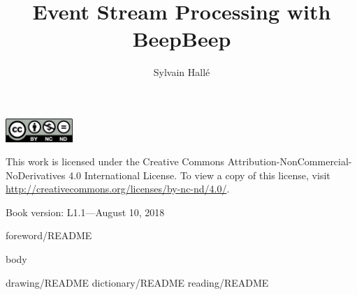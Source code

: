 \documentclass{lifmanual}
\title{Event Stream Processing with BeepBeep}
\author{Sylvain Hallé}
\begin{document}
\frontmatter

\newpage

\cleardoublepage

\newpage

\thispagestyle{empty}
\pagestyle{empty}
\rule{0in}{6in}
\noindent
\includegraphics[width=1in]{by-nc-nd}\\
{\sf\small
\noindent
This work is licensed under the Creative Commons Attribution-NonCommercial-NoDerivatives 4.0 International License. To view a copy of this license, visit \url{http://creativecommons.org/licenses/by-nc-nd/4.0/}.\\

\noindent
\rule{0in}{8pt}
\noindent
Book version: L1.1---August 10, 2018}


\pagestyle{toc}
\tableofcontents
\newpage
{foreword/README}

\mainmatter
\thispagestyle{normal}
\pagestyle{normal}

{body}

\appendix
\renewcommand{\chaptername}{Appendix}
{drawing/README}
{dictionary/README}
{reading/README}

\pagestyle{index}
\printindex

\cleardoublepage
\thispagestyle{empty}
\phantom{W}
\newpage

\end{document}
